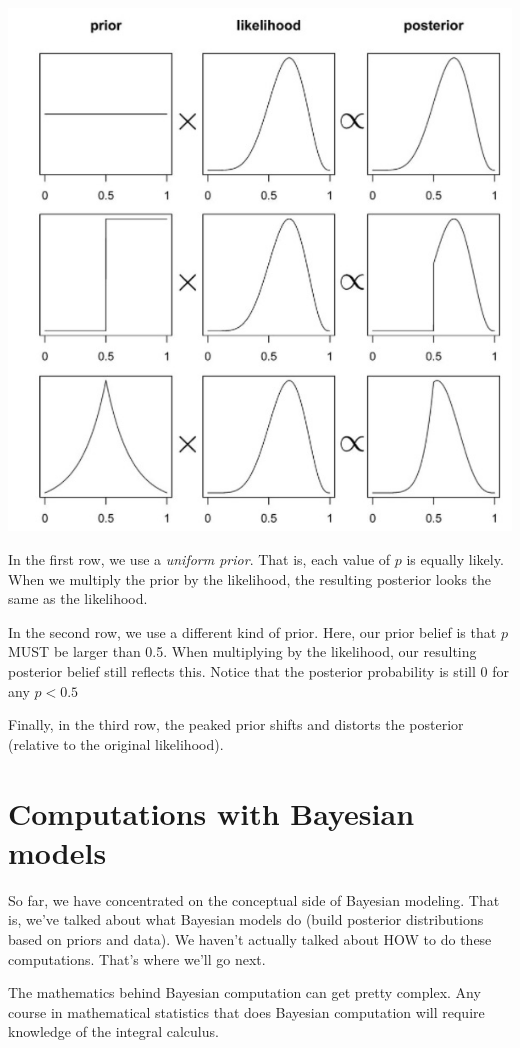 \documentclass[11pt]{article}
\begin{document}
\includegraphics[width=.9\linewidth]{figures/week9/priors.jpg}

In the first row, we use a \emph{uniform prior}.  That is, each value of $p$ is equally likely.  When we multiply the prior by the likelihood, the resulting posterior looks the same as the likelihood.

In the second row, we use a different kind of prior.  Here, our prior belief is that $p$ MUST be larger than 0.5.  When multiplying by the likelihood, our resulting posterior belief still reflects this.  Notice that the posterior probability is still 0 for any $p<0.5$

Finally, in the third row, the peaked prior shifts and distorts the posterior (relative to the original likelihood).

\section*{Computations with Bayesian models}
\label{sec-2}
So far, we have concentrated on the conceptual side of Bayesian modeling.  That is, we've talked about what Bayesian models do (build posterior distributions based on priors and data).  We haven't actually talked about HOW to do these computations.  That's where we'll go next.

The mathematics behind Bayesian computation can get pretty complex.  Any course in mathematical statistics that does Bayesian computation will require knowledge of the integral calculus.
\end{document}
